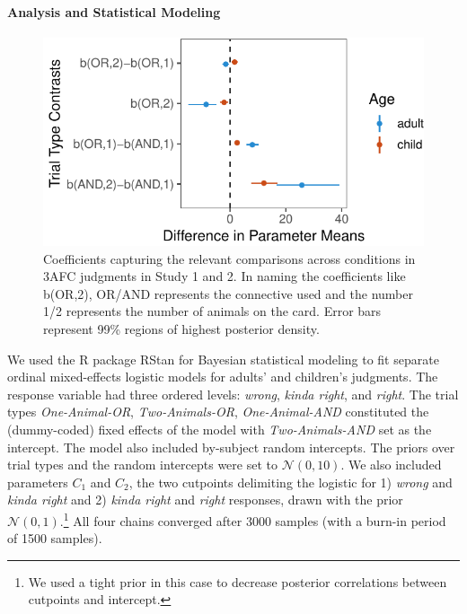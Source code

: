 \documentclass[floatsintext,man]{apa6}
\theoremstyle{definition}
\theoremstyle{definition}
\theoremstyle{definition}
\theoremstyle{remark}
\begin{document}
\paragraph{Analysis and Statistical
Modeling}\label{analysis-and-statistical-modeling}

\begin{figure}
\centering
\includegraphics{figs/stanModelPlot-1.pdf}
\caption{\label{fig:stanModelPlot}Coefficients capturing the relevant
comparisons across conditions in 3AFC judgments in Study 1 and 2. In
naming the coefficients like b(OR,2), OR/AND represents the connective
used and the number 1/2 represents the number of animals on the card.
Error bars represent 99\% regions of highest posterior density.}
\end{figure}

We used the R package RStan for Bayesian statistical modeling to fit
separate ordinal mixed-effects logistic models for adults' and
children's judgments. The response variable had three ordered levels:
\emph{wrong}, \emph{kinda right}, and \emph{right}. The trial types
\emph{One-Animal-OR}, \emph{Two-Animals-OR}, \emph{One-Animal-AND}
constituted the (dummy-coded) fixed effects of the model with
\emph{Two-Animals-AND} set as the intercept. The model also included
by-subject random intercepts. The priors over trial types and the random
intercepts were set to \(\mathcal{N}(0,10)\). We also included
parameters \(C_1\) and \(C_2\), the two cutpoints delimiting the
logistic for 1) \emph{wrong} and \emph{kinda right} and 2) \emph{kinda
right} and \emph{right} responses, drawn with the prior
\(\mathcal{N}(0,1)\).\footnote{We used a tight prior in this case to
  decrease posterior correlations between cutpoints and intercept.} All
four chains converged after 3000 samples (with a burn-in period of 1500
samples).
\end{document}
